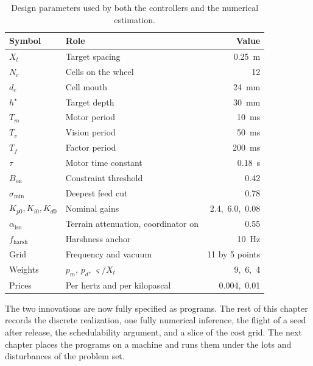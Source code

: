 \begin{table}[htbp]
\centering
\caption{Design parameters used by both the controllers and the numerical estimation.}
\label{tab:params}
\begin{tabular}{@{}llr@{}}
\toprule
Symbol & Role & Value \\
\midrule
$X_t$ & Target spacing & 0.25~m \\
$N_c$ & Cells on the wheel & 12 \\
$d_c$ & Cell mouth & 24~mm \\
$h^{\star}$ & Target depth & 30~mm \\
$T_m$ & Motor period & 10~ms \\
$T_v$ & Vision period & 50~ms \\
$T_f$ & Factor period & 200~ms \\
$\tau$ & Motor time constant & 0.18~s \\
$B_{\mathrm{on}}$ & Constraint threshold & 0.42 \\
$\sigma_{\min}$ & Deepest feed cut & 0.78 \\
$K_{p0},K_{i0},K_{d0}$ & Nominal gains & 2.4,\ 6.0,\ 0.08 \\
$\alpha_{\mathrm{iso}}$ & Terrain attenuation, coordinator on & 0.55 \\
$f_{\mathrm{harsh}}$ & Harshness anchor & 10~Hz \\
Grid & Frequency and vacuum & 11 by 5 points \\
Weights & $p_m$, $p_d$, $\varsigma/X_t$ & 9,\ 6,\ 4 \\
Prices & Per hertz and per kilopascal & 0.004,\ 0.01 \\
\bottomrule
\end{tabular}
\end{table}

The two innovations are now fully specified as programs. The rest of this chapter records the discrete realization, one fully numerical inference, the flight of a seed after release, the schedulability argument, and a slice of the cost grid. The next chapter places the programs on a machine and runs them under the lots and disturbances of the problem set.


